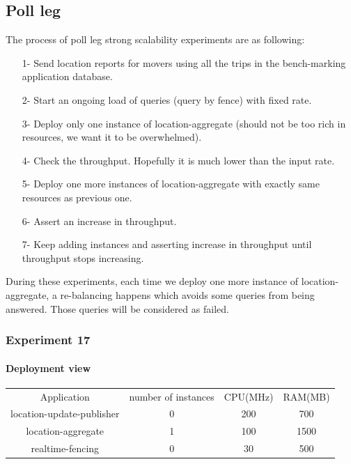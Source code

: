 \documentclass[a4]{report}
\begin{document}
        \subsection{Poll leg}
        The process of poll leg strong scalability experiments are as following:
        \begin{itemize}
            \item[1-] Send location reports for movers using all the trips in the bench-marking application database.
            \item[2-] Start an ongoing load of queries (query by fence) with fixed rate.
            \item[3-] Deploy only one instance of location-aggregate (should not be too rich in resources, we want it to be
            overwhelmed).
            \item[4-] Check the throughput. Hopefully it is much lower than the input rate.
            \item[5-] Deploy one more instances of location-aggregate with exactly same resources as previous one.
            \item[6-] Assert an increase in throughput.
            \item[7-] Keep adding instances and asserting increase in throughput until throughput stops increasing.
        \end{itemize}

        During these experiments, each time we deploy one more instance of location-aggregate, a re-balancing happens which
        avoids some queries from being answered.
        Those queries will be considered as failed.

        \subsubsection{Experiment 17}

        \paragraph{Deployment view}
        \begin{center}
            \begin{tabular}{ c c c c }
                Application               & number of instances & CPU(MHz) & RAM(MB) \\
                location-update-publisher & 0                   & 200      & 700     \\
                location-aggregate        & 1                   & 100      & 1500    \\
                realtime-fencing          & 0                   & 30       & 500     \\
            \end{tabular}
        \end{center}
\end{document}
